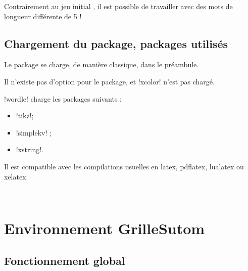 \documentclass[french,a4paper,11pt]{article}
\begin{document}
{\begin{noteblock}
Contrairement au jeu \og initial \fg, il est possible de travailler avec des mots de longueur différente de 5 !
\end{noteblock}


\subsection{Chargement du package, packages utilisés}

\begin{importantblock}
Le package se charge, de manière classique, dans le préambule.

Il n'existe pas d'option pour le package, et \packagetex!xcolor! n'est pas chargé.
\end{importantblock}


\begin{noteblock}
\packagetex!wordle! charge les packages suivants :

\begin{itemize}
	\item \packagetex!tikz!;
	\item \packagetex!simplekv! ;
	\item \packagetex!xstring!.
\end{itemize}

Il est compatible avec les compilations usuelles en \textsf{latex}, \textsf{pdflatex}, \textsf{lualatex} ou \textsf{xelatex}.
\end{noteblock}

\vfill~

\pagebreak

\section{Environnement GrilleSutom}

\subsection{Fonctionnement global}

}
\end{document}

